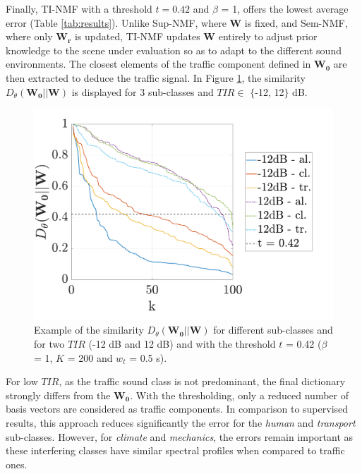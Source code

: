 \documentclass[twocolumn,a4paper,10pt]{article}
\begin{document}
Finally, TI-NMF with a threshold $t = 0.42$ and $\beta$ = 1, offers the lowest average error (Table \ref{tab:results}). Unlike Sup-NMF, where $\mathbf{W}$ is fixed, and Sem-NMF, where only $\mathbf{W_r}$ is updated, TI-NMF updates $\mathbf{W}$ entirely to adjust prior knowledge to the scene under evaluation so as to adapt to the different sound environments. The closest elements of the traffic component defined in $\mathbf{W_0}$ are then extracted to deduce the traffic signal. In Figure \ref{fig:dist_-12_12}, the similarity $D_{\theta}(\mathbf{W_0}||\mathbf{W})$ is displayed for 3 sub-classes and $TIR \in $ $\lbrace$-12, 12$\rbrace$ dB.

\begin{figure}[t]
    \centering
    \includegraphics[width=.8\linewidth]{figures/dist_-12_12.pdf}
    \caption{Example of the similarity $D_{\theta}\left( \mathbf{W_0} \vert \vert \mathbf{W}\right)$ for different sub-classes and for two $TIR$ (-12 dB and 12 dB) and with the threshold $t$ = 0.42 ($\beta$ = 1, $K$ = 200 and $w_t$ = 0.5 s).}
    \label{fig:dist_-12_12}
\end{figure}

For low $TIR$, as the traffic sound class is not predominant, the final dictionary strongly differs from the $\mathbf{W_0}$. With the thresholding, only a reduced number of basis vectors are considered as traffic components. In comparison to supervised results, this approach reduces significantly the error for the \textit{human} and \textit{transport} sub-classes.  However, for \textit{climate} and \textit{mechanics}, the errors remain important as these interfering classes have similar spectral profiles when compared to traffic ones.
\end{document}
